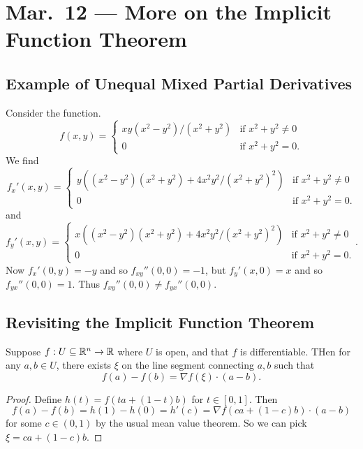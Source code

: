 \chapter{Mar.~12 --- More on the Implicit Function Theorem}

\section{Example of Unequal Mixed Partial Derivatives}

\begin{example}
  Consider the function.
  \[
    f(x, y) =
    \begin{cases}
      xy(x^2 - y^2) / (x^2 + y^2) & \text{if } x^2 + y^2 \ne 0 \\
      0 & \text{if } x^2 + y^2 = 0.
    \end{cases}
  \]
  We find
  \[
    f_x'(x, y) = \begin{cases}
      y((x^2 - y^2)(x^2 + y^2) + 4x^2 y^2 / (x^2 + y^2)^2) & \text{if } x^2 + y^2 \ne 0 \\
      0 & \text{if } x^2 + y^2 = 0.
    \end{cases}
  \]
  and
  \[
  f_y'(x, y) =
  \begin{cases}
    x((x^2 - y^2)(x^2 + y^2) + 4x^2 y^2 / (x^2 + y^2)^2) & \text{if } x^2 + y^2 \ne 0 \\
    0 & \text{if } x^2 + y^2 = 0.
  \end{cases}
  .\]
  Now $f_x'(0, y) = -y$ and so
  $f_{xy}''(0, 0) = -1$, but $f_y'(x, 0) = x$ and so
  $f_{yx}''(0, 0) = 1$.  Thus 
  $f_{xy}''(0, 0) \ne f_{yx}''(0, 0)$.
\end{example}

\section{Revisiting the Implicit Function Theorem}

\begin{theorem}
  Suppose $f : U \subseteq \mathbb{R}^n \to \mathbb{R}$ where $U$ is open,
  and that $f$ is differentiable. THen for any
  $a, b \in U$, there exists $\xi$ on the line segment
  connecting $a, b$ such that
  \[
    f(a) - f(b) = \nabla f(\xi) \cdot (a - b).
  \]
\end{theorem}

\begin{proof}
  Define $h(t) = f(ta + (1 - t)b)$ for $t \in [0, 1]$.
  Then
  \[
  f(a) - f(b) = h(1) - h(0) = h'(c)
  = \nabla f(ca + (1 - c)b) \cdot (a - b)
  \]
  for some $c \in (0, 1)$ by the usual mean value theorem.
  So we can pick $\xi = ca + (1 - c)b$.
\end{proof}

